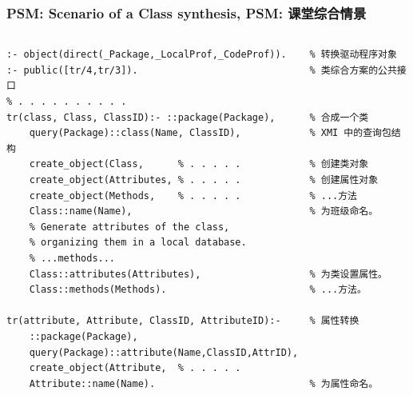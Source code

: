 \documentclass[10pt]{beamer}
\begin{document}
\begin{frame}[fragile]
  \frametitle{PSM: Scenario of a Class synthesis, PSM: 课堂综合情景}

  \begin{columns}
    \begin{column}{0.6\textwidth}
\begin{verbatim}
:- object(direct(_Package,_LocalProf,_CodeProf)).    % 转换驱动程序对象
:- public([tr/4,tr/3]).                              % 类综合方案的公共接口
% . . . . . . . . . .
tr(class, Class, ClassID):- ::package(Package),      % 合成一个类
    query(Package)::class(Name, ClassID),            % XMI 中的查询包结构
    create_object(Class,      % . . . . .            % 创建类对象
    create_object(Attributes, % . . . . .            % 创建属性对象
    create_object(Methods,    % . . . . .            % ...方法
    Class::name(Name),                               % 为班级命名。
    % Generate attributes of the class,
    % organizing them in a local database.
    % ...methods...
    Class::attributes(Attributes),                   % 为类设置属性。
    Class::methods(Methods).                         % ...方法。

tr(attribute, Attribute, ClassID, AttributeID):-     % 属性转换
    ::package(Package),
    query(Package)::attribute(Name,ClassID,AttrID),
    create_object(Attribute,  % . . . . .
    Attribute::name(Name).                           % 为属性命名。


\end{verbatim}
\end{column}
\end{columns}
\end{frame}
\end{document}
